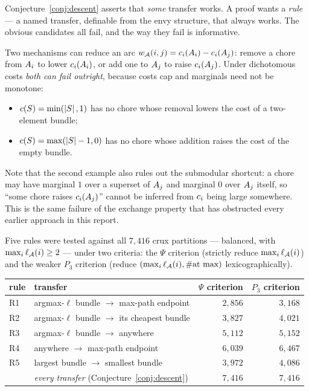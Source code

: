 Conjecture~\ref{conj:descent} asserts that \emph{some} transfer works. A proof
wants a \emph{rule} --- a named transfer, definable from the envy structure,
that always works. The obvious candidates all fail, and the way they fail is
informative.

Two mechanisms can reduce an arc $w_{\mathcal{A}}(i,j) = c_i(A_{i}) -
c_i(A_{j})$: remove a chore from $A_{i}$ to lower
$c_i(A_{i})$, or add one to $A_{j}$ to raise
$c_i(A_{j})$. Under dichotomous costs \emph{both can fail outright},
because costs cap and marginals need not be monotone:

\begin{itemize}
  \item $c(S) = \min(\left\lvert S\right\rvert,1)$ has no chore whose removal lowers the cost
    of a two-element bundle;
  \item $c(S) = \max(\left\lvert S\right\rvert-1,0)$ has no chore whose addition raises the
    cost of the empty bundle.
\end{itemize}

Note that the second example also rules out the submodular shortcut: a chore may
have marginal $1$ over a superset of $A_{j}$ and marginal $0$ over
$A_{j}$ itself, so ``some chore raises $c_i(A_{j})$'' cannot be
inferred from $c_i$ being large somewhere. This is the same failure of the
exchange property that has obstructed every earlier approach in this report.

Five rules were tested against all $7{,}416$ crux partitions --- balanced, with
$\max_i \ell_{\mathcal{A}}(i) \ge 2$ --- under two criteria: the $\Psi$ criterion
(strictly reduce $\max_i \ell_{\mathcal{A}}(i)$) and the weaker $P_3$ criterion
(reduce $(\max_i \ell_{\mathcal{A}}(i), \#\text{at max})$ lexicographically).

\begin{center}
\begin{tabular}{llrr}
\toprule
rule & transfer & $\Psi$ criterion & $P_3$ criterion \\
\midrule
R1 & argmax-$\ell$ bundle $\to$ max-path endpoint & $2{,}856$ & $3{,}168$ \\
R2 & argmax-$\ell$ bundle $\to$ its cheapest bundle & $3{,}827$ & $4{,}021$ \\
R3 & argmax-$\ell$ bundle $\to$ anywhere           & $5{,}112$ & $5{,}152$ \\
R4 & anywhere $\to$ max-path endpoint              & $6{,}039$ & $6{,}467$ \\
R5 & largest bundle $\to$ smallest bundle          & $3{,}972$ & $4{,}086$ \\
\midrule
   & \emph{every transfer} (Conjecture~\ref{conj:descent}) & $7{,}416$ & $7{,}416$ \\
\bottomrule
\end{tabular}
\end{center}

